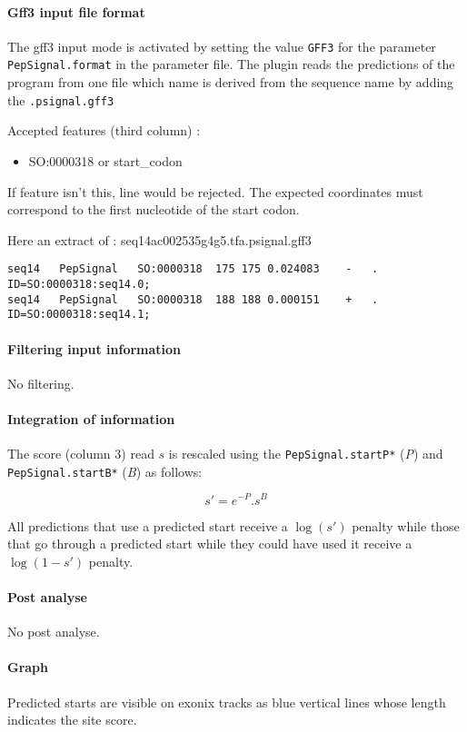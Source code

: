 \paragraph{Gff3 input file format}
The gff3 input mode is activated by setting the value \texttt{GFF3} for the parameter
\texttt{PepSignal.format} in the parameter file.
The plugin reads the predictions of the program from one file which
name is derived from the sequence name by adding the \texttt{.psignal.gff3}

Accepted features (third column) :
\begin{itemize}
\item  SO:0000318 or start\_codon
\end{itemize}
If feature isn't this, line would be rejected. The expected coordinates must correspond to the first nucleotide of the start codon.

Here an extract of : seq14ac002535g4g5.tfa.psignal.gff3
\begin{Verbatim}[fontsize=\tiny]
seq14	PepSignal	SO:0000318	175	175	0.024083	-	.	ID=SO:0000318:seq14.0;
seq14	PepSignal	SO:0000318	188	188	0.000151	+	.	ID=SO:0000318:seq14.1;
\end{Verbatim}

\paragraph{Filtering input information}

No filtering.


\paragraph{Integration of information}

The score (column 3) read $s$ is rescaled using the {\tt PepSignal.startP*} 
(\emph{P}) and {\tt PepSignal.startB*} (\emph{B}) as follows:

\[s' = e^{-P}.s^B\]

All predictions that use a predicted start receive a $\log(s')$
penalty while those that go through a predicted start while they
could have used it receive a $\log(1-s')$ penalty.


\paragraph{Post analyse}

No post analyse.


\paragraph{Graph}

Predicted starts are visible on exonix tracks as blue vertical lines
whose length indicates the site score.

